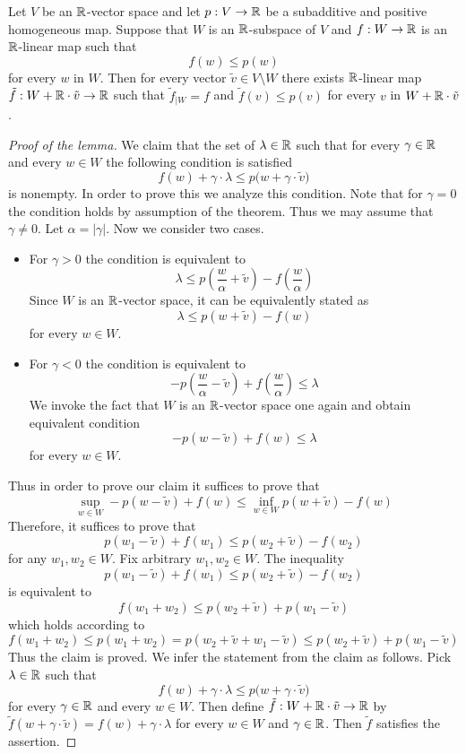 \begin{lemma}\label{lemma:Hahn_Banach_extension_in_codimension_one}
Let $V$ be an ${\mathbb R}$-vector space and let $p:V\rightarrow {\mathbb R}$ be a subadditive and positive homogeneous map. Suppose that $W$ is an ${\mathbb R}$-subspace of $V$ and $f:W\rightarrow {\mathbb R}$ is an ${\mathbb R}$-linear map such that
$$f(w) \leq p(w)$$
for every $w$ in $W$. Then for every vector $\tilde{v}\in V\setminus W$ there exists ${\mathbb R}$-linear map $\tilde{f}:W + {\mathbb R}\cdot \tilde{v} \rightarrow {\mathbb R}$ such that $\tilde{f}_{\mid W} = f$ and $\tilde{f}(v) \leq p(v)$ for every $v$ in $W + {\mathbb R}\cdot \tilde{v}$.
\end{lemma}
\begin{proof}[Proof of the lemma]
We claim that the set of $\lambda \in {\mathbb R}$ such that for every $\gamma \in {\mathbb R}$ and every $w \in W$ the following condition is satisfied
$$f(w) + \gamma \cdot \lambda  \leq p\big(w + \gamma \cdot \tilde{v}\big)$$
is nonempty. In order to prove this we analyze this condition. Note that for $\gamma = 0$ the condition holds by assumption of the theorem. Thus we may assume that $\gamma \neq 0$. Let $\alpha = |\gamma|$. Now we consider two cases.
\begin{itemize}
\item For $\gamma > 0$ the condition is equivalent to
$$\lambda \leq p\left(\frac{w}{\alpha} + \tilde{v}\right) - f\left(\frac{w}{\alpha}\right)$$
Since $W$ is an ${\mathbb R}$-vector space, it can be equivalently stated as
$$\lambda \leq p\left(w + \tilde{v}\right) - f\left(w\right)$$
for every $w \in W$.
\item For $\gamma < 0$ the condition is equivalent to
$$-p\left(\frac{w}{\alpha} - \tilde{v}\right) + f\left(\frac{w}{\alpha}\right) \leq  \lambda$$
We invoke the fact that $W$ is an ${\mathbb R}$-vector space one again and obtain equivalent condition
$$-p\left(w - \tilde{v}\right) + f\left(w\right) \leq \lambda$$
for every $w \in W$.
\end{itemize}
Thus in order to prove our claim it suffices to prove that
$$\sup_{w\in W}-p\left(w - \tilde{v}\right) + f\left(w\right) \leq \inf_{w\in W}p\left(w + \tilde{v}\right) - f\left(w\right)$$
Therefore, it suffices to prove that
$$p\left(w_1 - \tilde{v}\right) + f\left(w_1\right) \leq p\left(w_2 + \tilde{v}\right) - f\left(w_2\right)$$
for any $w_1,w_2\in W$. Fix arbitrary $w_1,w_2\in W$. The inequality
$$p\left(w_1 - \tilde{v}\right) + f\left(w_1\right) \leq p\left(w_2 + \tilde{v}\right) - f\left(w_2\right)$$
is equivalent to
$$f(w_1 + w_2) \leq p\left(w_2 + \tilde{v}\right) + p\left(w_1 - \tilde{v}\right)$$
which holds according to
$$f(w_1 + w_2) \leq p(w_1 + w_2) = p\left(w_2 + \tilde{v} + w_1 - \tilde{v}\right) \leq p\left(w_2 + \tilde{v}\right) + p\left(w_1 - \tilde{v}\right)$$
Thus the claim is proved. We infer the statement from the claim as follows. Pick $\lambda \in {\mathbb R}$ such that
$$f(w) + \gamma \cdot \lambda  \leq p\big(w + \gamma \cdot \tilde{v}\big)$$
for every $\gamma \in {\mathbb R}$ and every $w \in W$. Then define $\tilde{f}:W + {\mathbb R}\cdot \tilde{v} \rightarrow {\mathbb R}$ by $\tilde{f}(w + \gamma \cdot \tilde{v}) = f(w) + \gamma \cdot \lambda$ for every $w\in W$ and $\gamma \in {\mathbb R}$. Then $\tilde{f}$ satisfies the assertion.
\end{proof}

